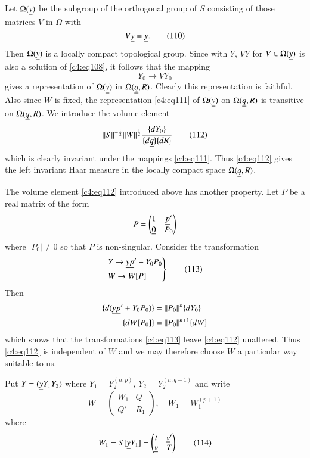 Let $\Omega(\underline{y})$ be the subgroup of the orthogonal group of $S$
consisting of those matrices $V$ in $\Omega$ with 
\begin{equation*}
V\underline{y}=\underline{y}.\tag{110}\label{c4:eq110}
\end{equation*}
Then $\Omega(\underline{y})$ is a locally compact topological group. Since
with $Y$, $VY$ for $V\in\Omega(\underline{y})$ is also a solution of
\eqref{c4:eq108}, it follows that the mapping
\begin{equation*}
Y_{0}\to VY_{0}\tag{111}\label{c4:eq111}
\end{equation*}
gives a representation of $\Omega(\underline{y})$ in
$\Omega(\underline{q},R)$. Clearly this representation is faithful. Also
since $W$ is fixed, the representation \eqref{c4:eq111} of $\Omega(\underline{y})$
on $\Omega(\underline{q},R)$ is transitive on $\Omega(\underline{q},R)$. We
introduce the volume element
\begin{equation*}
||S||^{-\frac{1}{2}}||W||^{\frac{1}{2}}\frac{\{dY_{0}\}}{\{d\underline{q}\}\{dR\}}\tag{112}\label{c4:eq112} 
\end{equation*}
which is clearly invariant under the mappings \eqref{c4:eq111}. Thus
\eqref{c4:eq112} gives the left invariant Haar measure in the locally
compact space $\Omega(\underline{q},R)$.

The volume element \eqref{c4:eq112} introduced above has another
property. Let $P$ be a real matrix of the form
$$
P=
\begin{pmatrix}
1 & \underline{p}'\\
\underline{0} & P_{0}
\end{pmatrix}
$$
where $|P_{0}|\neq 0$ so that $P$ is non-singular. Consider the
transformation 
\begin{equation*}
\left.
\begin{aligned}
& Y\to \underline{y}\underline{p}'+Y_{0}P_{0}\\
& W\to W[P]
\end{aligned}
\right\}\tag{113}\label{c4:eq113}
\end{equation*}\pageoriginale
Then 
\begin{align*}
\{d(\underline{y}\underline{p}'+Y_{0}P_{0})\} &= ||P_{0}||^{n}\{dY_{0}\}\\
\{dW[P_{0}]\} &= ||P_{0}||^{n+1}\{dW\}
\end{align*}
which shows that the transformations \eqref{c4:eq113} leave \eqref{c4:eq112}
unaltered. Thus \eqref{c4:eq112} is independent of $W$ and we may therefore
choose $W$ a particular way suitable to us.

Put $Y=(\underline{y}Y_{1}Y_{2})$ where $Y_{1}=Y_{2}^{(n,p)}$,
$Y_{2}=Y_{2}^{(n,q-1)}$ and write
$$
W=
\begin{pmatrix}
W_{1} & Q\\
Q' & R_{1}
\end{pmatrix},\quad W_{1}=W_{1}^{(p+1)}
$$
where
\begin{equation*}
W_{1}=S[\underline{y}Y_{1}]=
\begin{pmatrix}
t & \underline{v}'\\
\underline{v} & T
\end{pmatrix}\tag{114}\label{c4:eq114}
\end{equation*}

